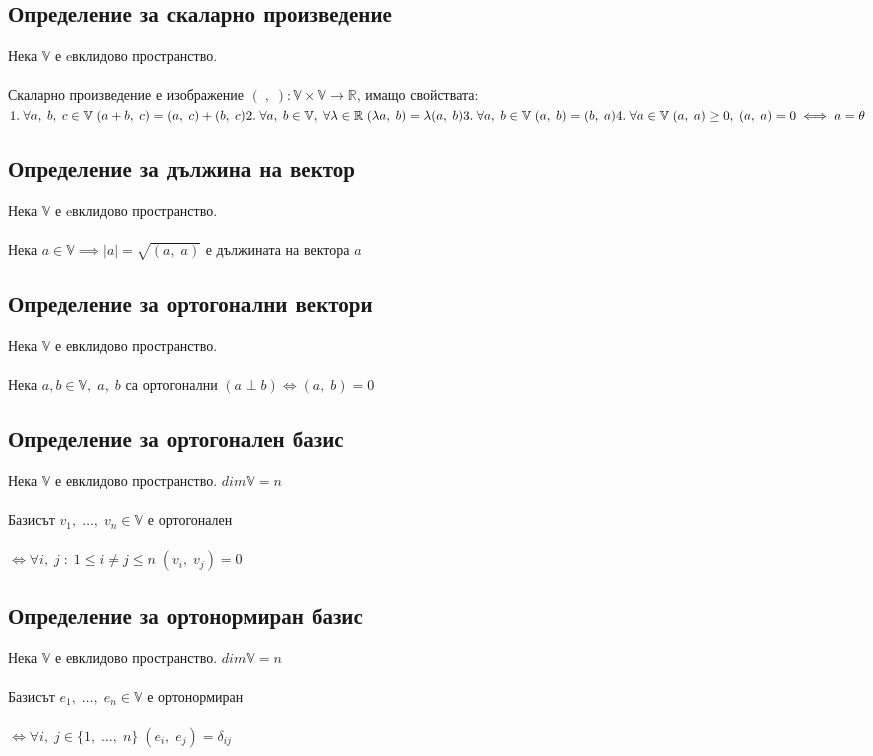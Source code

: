 \documentclass{article}
\newcommand{\V}{\mathbb{V}}
\newcommand{\R}{\mathbb{R}}
\newcommand{\n}[1]{#1_1, \; \dots, \; #1_n}
\newcommand{\OV}{\theta}
\newcommand{\iandj}{i, \; j \; : \; 1 \leq i \neq j \leq n}
\newcommand{\forallij}{\forall \iandj}
\begin{document}
    \subsection{Определение за скаларно произведение}
    Нека \(\V\) е eвклидово пространство.\\\\
    Скаларно произведение е изображение \(( \; , \; ) : \V \times \V \to \R\), имащо свойствата:\\
    \(1. \; \forall a, \;  b, \; c \in \V \; ( a + b, \; c ) = ( a, \; c ) + ( b, \; c )\\
    \\2. \; \forall a, \; b \in \V, \; \forall \lambda \in \R \; ( \lambda a, \; b ) = \lambda ( a, \; b )\\
    \\3. \; \forall a, \; b \in \V \; ( a, \; b ) = ( b, \; a )\\
    \\4. \; \forall a \in \V \; ( a, \; a ) \geq 0, \; ( a, \; a ) = 0 \iff a = \OV\)
    \subsection{Определение за дължина на вектор}
    Нека \(\V\) е eвклидово пространство.\\\\
    Нека \(a \in \V \implies |a| = \sqrt{(a, \; a)}\) е дължината на вектора \(a\)
    \subsection{Определение за ортогонални вектори}
    Нека \(\V\) е евклидово пространство.\\\\
    Нека \(a, b \in \V, \; a, \; b\) са ортогонални \((a \perp b) \iff (a, \; b) = 0 \)
    \subsection{Определение за ортогонален базис}
    Нека \(\V\) е евклидово пространство. \(dim\V = n\) \\\\
    Базисът \(\n{v} \in \V\) е ортогонален \\\\
    \(\iff \forallij \; (v_i, \; v_j) = 0\)
    \subsection{Определение за ортонормиран базис}
    Нека \(\V\) е евклидово пространство. \(dim\V = n\) \\\\
    Базисът \(\n{e} \in \V\) е ортонормиран \\\\
    \(\iff \forall i, \; j \in \{1, \; \dots, \; n\} \; (e_i, \; e_j) = \delta_{ij}\)
\end{document}
